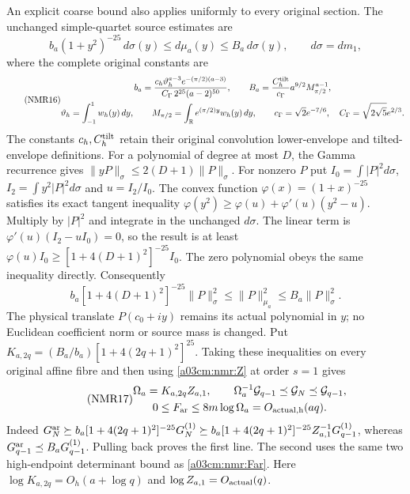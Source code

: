 An explicit coarse bound also applies uniformly to every original
section. The unchanged simple-quartet source estimates are
\[
b_a(1+y^2)^{-25}\,d\sigma(y)\leq d\mu_a(y)
\leq B_a\,d\sigma(y),\qquad d\sigma=dm_1,
\]
where the complete original constants are
\begin{equation}\tag{NMR16}\label{a03cm:nmr:source-constants}
\begin{gathered}
b_a=\frac{c_h\vartheta_h^{a-3}e^{-(\pi/2)(a-3)}}
 {C_\Gamma\,2^{25}(a-2)^{50}},\qquad
B_a=\frac{C_h^{\rm tilt}}{c_\Gamma}
                   a^{9/2}M_{\pi/2}^{a-1},\\
\vartheta_h=\int_{-1}^{1}w_h(y)\,dy,\qquad
M_{\pi/2}=\int_{\mathbb R}e^{(\pi/2)y}w_h(y)\,dy,\qquad
c_\Gamma=\sqrt2e^{-7/6},\quad
C_\Gamma=\sqrt{2\sqrt5}e^{2/3}.
\end{gathered}
\end{equation}
The constants $c_h,C_h^{\rm tilt}$ retain their original
convolution lower-envelope and tilted-envelope definitions.
For a polynomial of degree at most $D$, the Gamma recurrence gives
$\|yP\|_\sigma\leq2(D+1)\|P\|_\sigma$.
For nonzero $P$ put $I_0=\int|P|^2d\sigma$,
$I_2=\int y^2|P|^2d\sigma$ and $u=I_2/I_0$.
The convex function $\varphi(x)=(1+x)^{-25}$ satisfies its exact
tangent inequality
$\varphi(y^2)\geq\varphi(u)+\varphi'(u)(y^2-u)$.
Multiply by $|P|^2$ and integrate in the unchanged $d\sigma$.
The linear term is $\varphi'(u)(I_2-uI_0)=0$, so the result is at
least $\varphi(u)I_0\geq[1+4(D+1)^2]^{-25}I_0$.
The zero polynomial obeys the same inequality directly. Consequently
\[
b_a[1+4(D+1)^2]^{-25}\|P\|_\sigma^2
\leq\|P\|_{\mu_a}^2\leq B_a\|P\|_\sigma^2 .
\]
The physical translate $P(c_0+iy)$ remains its actual polynomial
in $y$; no Euclidean coefficient norm or source mass is changed.
Put
$K_{a,2q}=(B_a/b_a)[1+4(2q+1)^2]^{25}$.
Taking these inequalities on every original affine fibre and then
using \eqref{a03cm:nmr:Z} at order $s=1$ gives
\begin{equation}\tag{NMR17}\label{a03cm:nmr:coarse}
\begin{gathered}
\Omega_a=K_{a,2q}Z_{a,1},\qquad
\Omega_a^{-1}\mathcal G_{q-1}\preceq
                 \mathcal G_N\preceq\mathcal G_{q-1},\\
0\leq F_{\rm ar}\leq8m\log\Omega_a=O_{\rm actual,h}(aq).
\end{gathered}
\end{equation}
Indeed $G_N^{\rm ar}\succeq
b_a[1+4(2q+1)^2]^{-25}G_N^{(1)}
\succeq b_a[1+4(2q+1)^2]^{-25}Z_{a,1}^{-1}G_{q-1}^{(1)}$,
whereas $G_{q-1}^{\rm ar}\preceq B_aG_{q-1}^{(1)}$.
Pulling back proves the first line. The second uses the same two
high-endpoint determinant bound as \eqref{a03cm:nmr:Far}.
Here $\log K_{a,2q}=O_h(a+\log q)$ and $\log Z_{a,1}=O_{\rm actual}(q)$.

